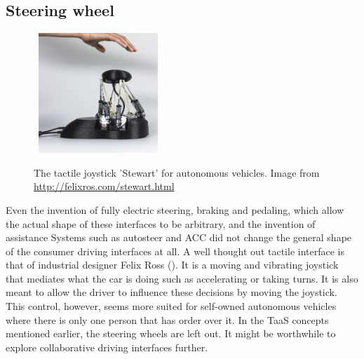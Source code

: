 \subsection{Steering wheel}\label{ssec:steering}
\begin{figure}
   \hfill\ \includegraphics[width=0.4\textwidth]{fig/joystick}\hfill\
    \caption[The tactile joystick 'Stewart' for autonomous vehicles]{The tactile joystick 'Stewart' for autonomous vehicles. Image from \url{http://felixros.com/stewart.html}}
    \label{fig:joystick}
\end{figure}
Even the invention of fully electric steering, braking and pedaling, which allow the actual shape of these interfaces to be arbitrary, and the invention of assistance Systems such as autosteer and ACC did not change the general shape of the consumer driving interfaces at all. A well thought out tactile interface is that of industrial designer Felix Ross (\emph{}). It is a moving and vibrating joystick that mediates what the car is doing such as accelerating or taking turns. It is also meant to allow the driver to influence these decisions by moving the joystick. This control, however, seems more suited for self-owned autonomous vehicles where there is only one person that has order over it. In the TaaS concepts mentioned earlier, the steering wheels are left out. It might be worthwhile to explore collaborative driving interfaces further. 

